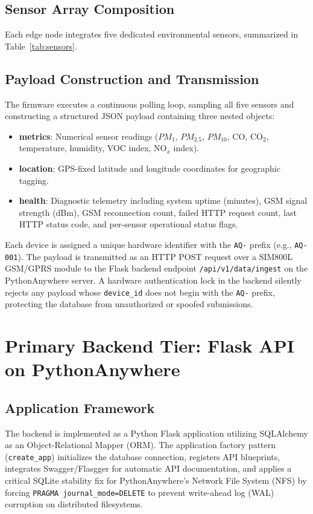 \tabMethodologyMcu

\subsection{Sensor Array Composition}
Each edge node integrates five dedicated environmental sensors, summarized in Table~\ref{tab:sensors}.

\tabMethodologySensors

\figMethodologyWiring

\subsection{Payload Construction and Transmission}
The firmware executes a continuous polling loop, sampling all five sensors and constructing a structured JSON payload containing three nested objects:
\begin{itemize}[nosep]
    \item \textbf{metrics}: Numerical sensor readings ($PM_1$, $PM_{2.5}$, $PM_{10}$, CO, CO$_2$, temperature, humidity, VOC index, NO$_x$ index).
    \item \textbf{location}: GPS-fixed latitude and longitude coordinates for geographic tagging.
    \item \textbf{health}: Diagnostic telemetry including system uptime (minutes), GSM signal strength (dBm), GSM reconnection count, failed HTTP request count, last HTTP status code, and per-sensor operational status flags.
\end{itemize}

Each device is assigned a unique hardware identifier with the \texttt{AQ-} prefix (e.g., \texttt{AQ-001}). The payload is transmitted as an HTTP POST request over a SIM800L GSM/GPRS module to the Flask backend endpoint \texttt{/api/v1/data/ingest} on the PythonAnywhere server. A hardware authentication lock in the backend silently rejects any payload whose \texttt{device\_id} does not begin with the \texttt{AQ-} prefix, protecting the database from unauthorized or spoofed submissions.

\figMethodologyPayload

\figMethodologyFirmwareFsm

\section{Primary Backend Tier: Flask API on PythonAnywhere}

\subsection{Application Framework}
The backend is implemented as a Python Flask application utilizing SQLAlchemy as an Object-Relational Mapper (ORM). The application factory pattern (\texttt{create\_app}) initializes the database connection, registers API blueprints, integrates Swagger/Flasgger for automatic API documentation, and applies a critical SQLite stability fix for PythonAnywhere's Network File System (NFS) by forcing \texttt{PRAGMA journal\_mode=DELETE} to prevent write-ahead log (WAL) corruption on distributed filesystems.

